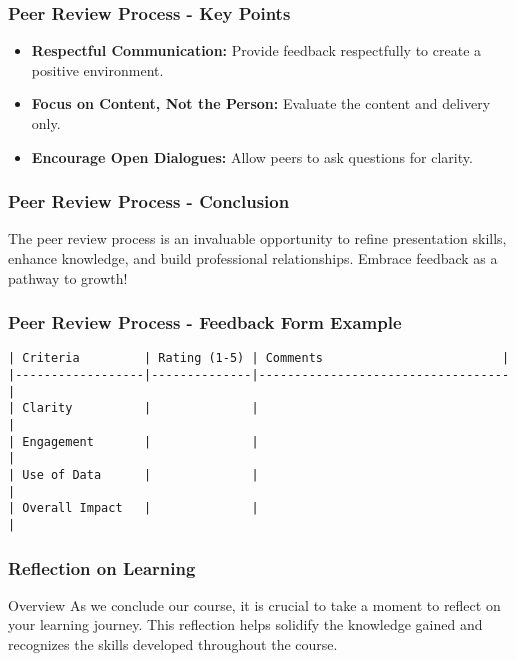 \documentclass[aspectratio=169]{beamer}
\begin{document}
\begin{frame}[fragile]
    \frametitle{Peer Review Process - Key Points}
    \begin{itemize}
        \item \textbf{Respectful Communication:} 
            Provide feedback respectfully to create a positive environment.
        \item \textbf{Focus on Content, Not the Person:} 
            Evaluate the content and delivery only.
        \item \textbf{Encourage Open Dialogues:} 
            Allow peers to ask questions for clarity.
    \end{itemize}
\end{frame}

\begin{frame}[fragile]
    \frametitle{Peer Review Process - Conclusion}
    The peer review process is an invaluable opportunity to refine presentation skills, enhance knowledge, and build professional relationships. Embrace feedback as a pathway to growth!
\end{frame}

\begin{frame}[fragile]
    \frametitle{Peer Review Process - Feedback Form Example}
    \begin{lstlisting}
| Criteria         | Rating (1-5) | Comments                         |
|------------------|--------------|-----------------------------------|
| Clarity          |              |                                   |
| Engagement       |              |                                   |
| Use of Data      |              |                                   |
| Overall Impact   |              |                                   |
    \end{lstlisting}
\end{frame}

\begin{frame}[fragile]
    \frametitle{Reflection on Learning}
    \begin{block}{Overview}
        As we conclude our course, it is crucial to take a moment to reflect on your learning journey. This reflection helps solidify the knowledge gained and recognizes the skills developed throughout the course.
    \end{block}
\end{frame}
\end{document}
